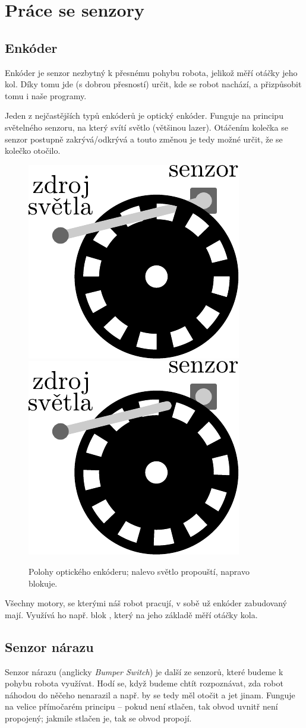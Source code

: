 \documentclass[../main.tex]{subfiles}
\begin{document}
	\section{Práce se senzory}

	\subsection{Enkóder}\label{cha:encoder}
	Enkóder je senzor nezbytný k přesnému pohybu robota, jelikož měří otáčky jeho kol. Díky tomu jde (s dobrou přesností) určit, kde se robot nachází, a přizpůsobit tomu i naše programy.

	Jeden z nejčastějších typů enkóderů je optický enkóder. Funguje na principu světelného senzoru, na který svítí světlo (většinou lazer). Otáčením kolečka se senzor postupně zakrývá/odkrývá a touto změnou je tedy možné určit, že se kolečko otočilo.

	\begin{figure}[h!]%
		\centering%
		\includegraphics[width=0.25\linewidth]{../Images/03/encoder-through.pdf}
		\hspace{.15\textwidth}%
		\includegraphics[width=0.25\linewidth]{../Images/03/encoder-blocked.pdf}
		\caption{Polohy optického enkóderu; nalevo světlo propouští, napravo blokuje.}
	\end{figure}

	Všechny motory, se kterými náš robot pracují, v sobě už enkóder zabudovaný mají. Využívá ho např. blok , který na jeho základě měří otáčky kola.

	\subsection{Senzor nárazu}
	Senzor nárazu (anglicky \textit{Bumper Switch}) je další ze senzorů, které budeme k pohybu robota využívat. Hodí se, když budeme chtít rozpoznávat, zda robot náhodou do něčeho nenarazil a např. by se tedy měl otočit a jet jinam. Funguje na velice přímočarém principu -- pokud není stlačen, tak obvod uvnitř není propojený; jakmile stlačen je, tak se obvod propojí.
\end{document}
